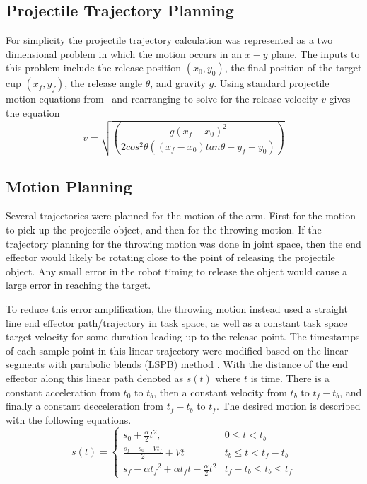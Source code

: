 \documentclass[conference]{IEEEtran}
\begin{document}
\subsection{Projectile Trajectory Planning}
For simplicity the projectile trajectory calculation was represented as a two
dimensional problem in which the motion occurs in an $x-y$ plane. The inputs to
this problem include the release position $(x_0, y_0)$, the final position of
the target cup $(x_f, y_f)$, the release angle $\theta$, and gravity $g$. Using
standard projectile motion equations from~\cite{william25} and rearranging to solve
for the release velocity $v$ gives the equation
\begin{equation*}
  v = \sqrt{ \left(\frac{g(x_f-x_0)^2}{2 cos^2\theta ((x_f-x_0) tan \theta - y_f + y_0)} \right ) }
\end{equation*}

\subsection{Motion Planning}
Several trajectories were planned for the motion of the arm. First for the
motion to pick up the projectile object, and then for the throwing motion. If
the trajectory planning for the throwing motion was done in joint space, then
the end effector would likely be rotating close to the point of releasing the
projectile object. Any small error in the robot timing to release the object
would cause a large error in reaching the target.

To reduce this error amplification, the throwing motion instead used a straight
line end effector path/trajectory in task space, as well as a constant task
space target velocity for some duration leading up to the release point. The
timestamps of each sample point in this linear trajectory were modified based on
the linear segments with parabolic blends (LSPB) method
\cite{mark2020control}. With the distance of the end effector along this linear
path denoted as $s(t)$ where $t$ is time. There is a constant acceleration from
$t_0$ to $t_b$, then a constant velocity from $t_b$ to $t_f-t_b$, and finally a
constant decceleration from $t_f-t_b$ to $t_f$. The desired motion is described
with the following equations.
\begin{equation*}
  s(t) =
  \begin{cases}
    s_0+\frac{\alpha}{2}t^2, & 0 \leq t < t_b \\
    \frac{s_f+s_0-Vt_f}{2} + Vt & t_b \leq t < t_f-t_b \\
    s_f-\alpha {t_f}^2+\alpha t_f t-\frac{\alpha}{2} t^2 & t_f-t_b \leq t_b \leq t_f
  \end{cases}
\end{equation*}
\end{document}
